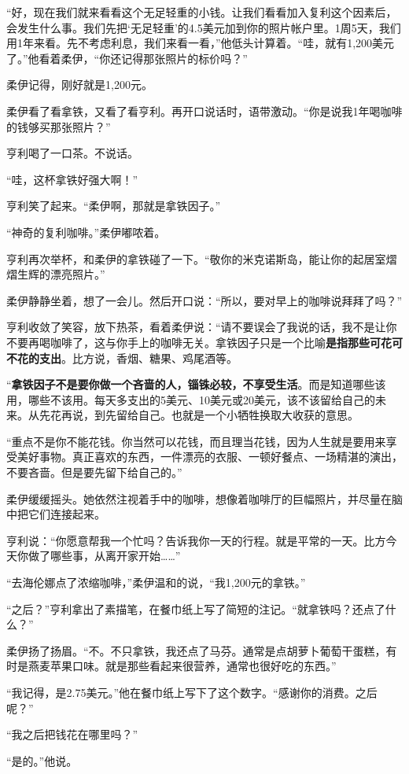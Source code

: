 “好，现在我们就来看看这个无足轻重的小钱。让我们看看加入复利这个因素后，会发生什么事。我们先把‘无足轻重’的4.5美元加到你的照片帐户里。1周5天，我们用1年来看。先不考虑利息，我们来看一看，”他低头计算着。“哇，就有1,200美元了。”他看着柔伊，“你还记得那张照片的标价吗？”

柔伊记得，刚好就是1,200元。

柔伊看了看拿铁，又看了看亨利。再开口说话时，语带激动。“你是说我1年喝咖啡的钱够买那张照片？”

亨利喝了一口茶。不说话。

“哇，这杯拿铁好强大啊！”

亨利笑了起来。“柔伊啊，那就是拿铁因子。”

“神奇的复利咖啡。”柔伊嘟哝着。

亨利再次举杯，和柔伊的拿铁碰了一下。“敬你的米克诺斯岛，能让你的起居室熠熠生辉的漂亮照片。”

柔伊静静坐着，想了一会儿。然后开口说：“所以，要对早上的咖啡说拜拜了吗？”

亨利收敛了笑容，放下热茶，看着柔伊说：“请不要误会了我说的话，我不是让你不要再喝咖啡了，这与你手上的咖啡无关。拿铁因子只是一个比喻\textbf{是指那些可花可不花的支出}。比方说，香烟、糖果、鸡尾酒等。

“\textbf{拿铁因子不是要你做一个吝啬的人，锱铢必较，不享受生活}。而是知道哪些该用，哪些不该用。每天多支出的5美元、10美元或20美元，该不该留给自己的未来。从先花再说，到先留给自己。也就是一个小牺牲换取大收获的意思。

“重点不是你不能花钱。你当然可以花钱，而且理当花钱，因为人生就是要用来享受美好事物。真正喜欢的东西，一件漂亮的衣服、一顿好餐点、一场精湛的演出，不要吝啬。但是要先留下给自己的。”

柔伊缓缓摇头。她依然注视着手中的咖啡，想像着咖啡厅的巨幅照片，并尽量在脑中把它们连接起来。

亨利说：“你愿意帮我一个忙吗？告诉我你一天的行程。就是平常的一天。比方今天你做了哪些事，从离开家开始……”

“去海伦娜点了浓缩咖啡，”柔伊温和的说，“我1,200元的拿铁。”

“之后？”亨利拿出了素描笔，在餐巾纸上写了简短的注记。“就拿铁吗？还点了什么？”

柔伊扬了扬眉。“不。不只拿铁，我还点了马芬。通常是点胡萝卜葡萄干蛋糕，有时是燕麦苹果口味。就是那些看起来很营养，通常也很好吃的东西。”

“我记得，是2.75美元。”他在餐巾纸上写下了这个数字。“感谢你的消费。之后呢？”

“我之后把钱花在哪里吗？”

“是的。”他说。

